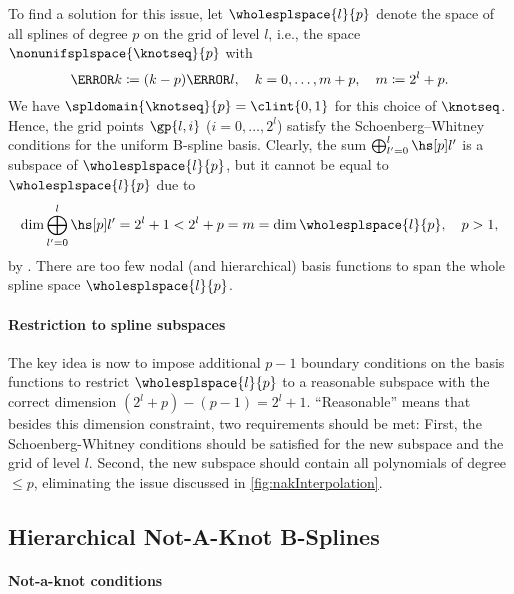 To find a solution for this issue,
let $\wholesplspace{l}{p}$ denote the space of all splines of degree $p$
on the grid of level $l$, i.e., the space $\nonunifsplspace{\knotseq}{p}$ with
\begin{equation}
  \label{eq:fullGridKnots}
  \knot{k} \ceq (k - p) \ms{l},\quad
  k = 0, \dotsc, m + p,\quad
  m \ceq 2^l + p.
\end{equation}
We have $\spldomain{\knotseq}{p} = \clint{0, 1}$
for this choice of $\knotseq$.
Hence, the grid points $\gp{l,i}$ ($i = 0, \dotsc, 2^l$) satisfy
the Schoenberg--Whitney conditions for the uniform B-spline basis.
Clearly, the sum $\bigoplus_{l'=0}^l \hsbspl{l'}{p}$
is a subspace of $\wholesplspace{l}{p}$,
but it cannot be equal to $\wholesplspace{l}{p}$ due to
\begin{equation}
  \dim \bigoplus_{l'=0}^l \hsbspl{l'}{p}
  = 2^l + 1
  < 2^l + p
  = m
  = \dim \wholesplspace{l}{p},\quad
  p > 1,
\end{equation}
by .
There are too few nodal (and hierarchical) basis functions to
span the whole spline space $\wholesplspace{l}{p}$.

\paragraph{Restriction to spline subspaces}

The key idea is now to impose additional $p - 1$ boundary conditions
on the basis functions to restrict $\wholesplspace{l}{p}$ to a reasonable subspace
with the correct dimension $(2^l + p) - (p - 1) = 2^l + 1$.
``Reasonable'' means that besides this dimension constraint,
two requirements should be met:
First, the Schoenberg-Whitney conditions should be satisfied for
the new subspace and the grid of level $l$.
Second, the new subspace should contain all polynomials of degree $\le p$,
eliminating the issue discussed in \cref{fig:nakInterpolation}.



\subsection{Hierarchical Not-A-Knot B-Splines}
\label{sec:322NAKBSplines}

\paragraph{Not-a-knot conditions}

